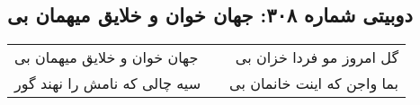\begin{center}
\section*{دوبیتی شماره ۳۰۸: جهان خوان و خلایق میهمان بی}
\label{sec:308}
\begin{longtable}{l p{0.5cm} r}
جهان خوان و خلایق میهمان بی
&&
گل امروز مو فردا خزان بی
\\
سیه چالی که نامش را نهند گور
&&
بما واجن که اینت خانمان بی
\\
\end{longtable}
\end{center}
